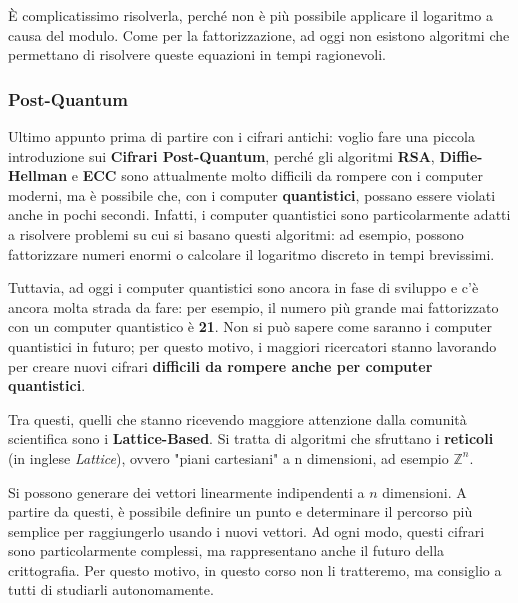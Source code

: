 \documentclass{rapport}
\begin{document}
È complicatissimo risolverla, perché non è più possibile applicare il logaritmo a causa del modulo. Come per la fattorizzazione, ad oggi non esistono algoritmi che permettano di risolvere queste equazioni in tempi ragionevoli.


\subsubsection{Post-Quantum}
Ultimo appunto prima di partire con i cifrari antichi: voglio fare una piccola introduzione sui \textbf{Cifrari Post-Quantum}, perché gli algoritmi \textbf{RSA}, \textbf{Diffie-Hellman} e \textbf{ECC} sono attualmente molto difficili da rompere con i computer moderni, ma è possibile che, con i computer \textbf{quantistici}, possano essere violati anche in pochi secondi. Infatti, i computer quantistici sono particolarmente adatti a risolvere problemi su cui si basano questi algoritmi: ad esempio, possono fattorizzare numeri enormi o calcolare il logaritmo discreto in tempi brevissimi.

Tuttavia, ad oggi i computer quantistici sono ancora in fase di sviluppo e c’è ancora molta strada da fare: per esempio, il numero più grande mai fattorizzato con un computer quantistico è \textbf{21}. Non si può sapere come saranno i computer quantistici in futuro; per questo motivo, i maggiori ricercatori stanno lavorando per creare nuovi cifrari \textbf{difficili da rompere anche per computer quantistici}.

Tra questi, quelli che stanno ricevendo maggiore attenzione dalla comunità scientifica sono i \textbf{Lattice-Based}. Si tratta di algoritmi che sfruttano i \textbf{reticoli} (in inglese \textit{Lattice}), ovvero "piani cartesiani" a n dimensioni, ad esempio $\mathbb{Z} ^ n$.

Si possono generare dei vettori linearmente indipendenti a $n$ dimensioni. A partire da questi, è possibile definire un punto e determinare il percorso più semplice per raggiungerlo usando i nuovi vettori. Ad ogni modo, questi cifrari sono particolarmente complessi, ma rappresentano anche il futuro della crittografia. Per questo motivo, in questo corso non li tratteremo, ma consiglio a tutti di studiarli autonomamente.
\end{document}
